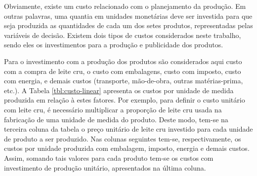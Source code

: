 \documentclass [11pt]{articleSBPO}
\begin{document}
Obviamente, existe um custo relacionado com o planejamento da produção. Em outras palavras, uma quantia em unidades monetárias deve ser investida para que seja produzida as quantidades de cada um dos setes produtos, representadas pelas variáveis de decisão. Existem dois tipos de custos considerados neste trabalho, sendo eles os investimentos para a produção e publicidade dos produtos.

Para o investimento com a produção dos produtos são considerados aqui custo com a compra de leite cru, o custo com embalagens, custo com imposto, custo com energia, e demais custos (transporte, mão-de-obra, outras matérias-prima, etc.). A Tabela \ref{tbl:custo-linear} apresenta os custos por unidade de medida produzida em relação à estes fatores. Por exemplo, para definir o custo unitário com leite cru, é necessário multiplicar a proporção de leite cru usada na fabricação de uma unidade de medida do produto. Deste modo, tem-se na terceira coluna da tabela o preço unitário de leite cru investido para cada unidade de produto a ser produzido. Nas colunas seguintes tem-se, respectivamente, os custos por unidade produzida com embalagem, imposto, energia e demais custos. Assim, somando tais valores para cada produto tem-se os custos com investimento de produção unitário, apresentados na última coluna.
\end{document}
